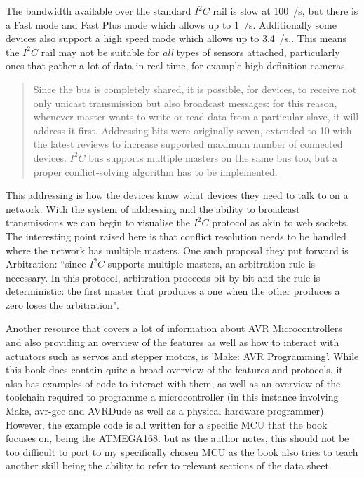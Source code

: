 \documentclass[11pt,a4paper,titlepage]{report}
\begin{document}
	The bandwidth available over the standard $I^{2}C$ rail is slow at 100\unit{\kilo\bit}/\unit{\second}, but there is a Fast mode and Fast Plus mode which allows up to 1\unit{\mega\bit}/\unit{\second}. Additionally some devices also support a high speed mode which allows up to 3.4\unit{\mega\bit}/\unit{\second}.\cite{I2C_FAST}. This means the $I^{2}C$ rail may not be suitable for \textit{all} types of sensors attached, particularly ones that gather a lot of data in real time, for example high definition cameras. 
	
	\begin{quote}
		Since the bus is completely shared, it is possible, for devices, to receive not only unicast transmission but also broadcast messages: for this reason, whenever master wants to write or read data from a particular slave, it will address it first. Addressing bits were originally seven, extended to 10 with the latest reviews to increase supported maximum number of connected devices. $I^{2}C$ bus supports multiple masters on the same bus too, but a proper conflict-solving algorithm has to be implemented. \cite{I2C}
	\end{quote}
	
	This addressing is how the devices know what devices they need to talk to on a network. With the system of addressing and the ability to broadcast transmissions we can begin to visualise the $I^{2}C$ protocol as akin to web sockets. The interesting point raised here is that conflict resolution needs to be handled where the network has multiple masters. One such proposal they put forward is Arbitration: ``since $I^{2}C$ supports multiple masters, an arbitration rule is necessary. In this protocol, arbitration proceeds bit by bit and the rule is deterministic: the first master that produces a one when the other produces a zero loses the arbitration"\cite{I2C}. 
	
	Another resource that covers a lot of information about AVR Microcontrollers and also providing an overview of the features as well as how to interact with actuators such as servos and stepper motors, is 'Make: AVR Programming'\cite{MAKE_AVR}. While this book does contain quite a broad overview of the features and protocols, it also has examples of code to interact with them, as well as an overview of the toolchain required to programme a microcontroller (in this instance involving Make, avr-gcc\cite{GCC_AVR} and AVRDude\cite{AVRDUDE} as well as a physical hardware programmer). However, the example code is all written for a specific MCU that the book focuses on, being the ATMEGA168. but as the author notes, this should not be too difficult to port to my specifically chosen MCU as the book also tries to teach another skill being the ability to refer to relevant sections of the data sheet. 
	
\end{document}
